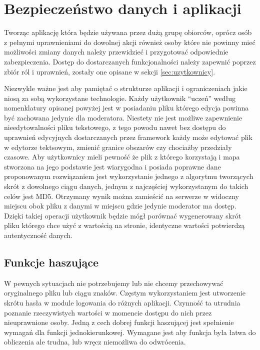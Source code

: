 \clearpage
\newpage
\section{Bezpieczeństwo danych i aplikacji}
\label{sec:bezpieczenstwo}

Tworząc aplikację która będzie używana przez dużą grupę obiorców, oprócz osób z pełnymi uprawnieniami do dowolnej akcji również osoby które nie powinny mieć możliwości zmiany danych należy przewidzieć i przygotować odpowiednie zabezpieczenia. Dostęp do dostarczanych funkcjonalności należy zapewnić poprzez zbiór ról i uprawnień, zostały one opisane w sekcji \ref{sec:uzytkownicy}.

Niezwykle ważne jest aby pamiętać o strukturze aplikacji i ograniczeniach jakie niosą za sobą wykorzystane technologie. Każdy użytkownik ``uczeń'' według nomenklatury opisanej powyżej jest w posiadaniu pliku którego edycja powinna być zachowana jedynie dla moderatora. Niestety nie jest możliwe zapewnienie nieedytowalności pliku tekstowego, z tego powodu nawet bez dostępu do uprawnień edycyjnych dostarczanych przez framework każdy może edytować plik w edytorze tektsowym, zmienić granice obszarów czy chociażby przedziały czasowe. Aby użytkownicy mieli pewność że plik z którego korzystają i mapa stworzona na jego podstawie jest wiarygodna i posiada poprawne dane proponowanym rozwiązaniem jest wykorzystanie jednego z algorytmu tworzących skrót z dowolnego ciągu danych, jednym z najczęściej wykorzystanym do takich celów jest MD5. Otrzymany wynik można zamieścić na serwerze w widoczny miejscu obok pliku z danymi w miejscu gdzie jedynie moderator ma dostęp. Dzięki takiej operacji użytkownik będzie mógł porównać wygenerowany skrót pliku którego chce użyć z wartością na stronie, identyczne wartości potwierdzą autentyczność danych.

\subsection{Funkcje haszujące}
\label{sec:hashfunction}

W pewnych sytuacjach nie potrzebujemy lub nie chcemy przechowywać oryginalnego pliku lub ciągu znaków. Częstym wykorzystaniem jest utworzenie skrótu hasła w module logowania do różnych aplikacji. Czynność ta utrudnia poznanie rzeczywistych wartości w momencie dostępu do nich przez nieuprawnione osoby. Jedną z cech dobrej funkcji haszującej jest
spełnienie wymagań dla funkcji jednokierunkowej. Wymagane jest aby funkcja była łatwa do obliczenia ale trudna, lub wręcz niemożliwa do odwrócenia.

